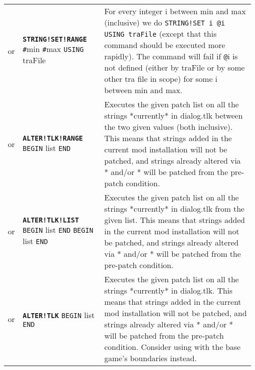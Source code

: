\documentclass{article}
\def\ttref#1{\ahrefloc{#1}{\tt #1}}
\def\DEFINE#1{{\tt \bf #1}\label{#1}\index{#1}}
\def\t#1{{\tt #1}}
\def\Slist{{\color{red} list }}
\begin{document}
\begin{tabular}{cp{10in}|p{10in}}
  or & \DEFINE{STRING!SET!RANGE} \t{\#}min \t{\#}max \t{USING} traFile &
    For every integer i between min and max (inclusive) we do
    \t{STRING!SET i @i USING traFile} (except that this command should be
    executed more rapidly). The command will fail if \t{@}i is not defined
    (either by traFile or by some other tra file in scope) for some i
    between min and max.  \\

	or & \DEFINE{ALTER!TLK!RANGE} \ttref{value} \ttref{value} \t{BEGIN} \ttref{patch} \Slist \t{END} &
		Executes the given patch list on all the strings *currently* in dialog.tlk between the
		two given values (both inclusive).
		This means that strings added in the current mod installation will not
		be patched, and strings already altered via \ttref{ALTER!TLK}* and/or \ttref{STRING!SET}*
		will be patched from the pre-patch condition.\\

or & \DEFINE{ALTER!TLK!LIST} \t{BEGIN} \ttref{value} \Slist \t{END} \t{BEGIN} \ttref{patch} \Slist \t{END} &
		Executes the given patch list on all the strings *currently* in dialog.tlk from the given list.
		This means that strings added in the current mod installation will not
		be patched, and strings already altered via \ttref{ALTER!TLK}* and/or \ttref{STRING!SET}*
		will be patched from the pre-patch condition. \\

	or & \DEFINE{ALTER!TLK} \t{BEGIN} \ttref{patch} \Slist \t{END} &
		Executes the given patch list on all the strings *currently* in dialog.tlk.
		This means that strings added in the current mod installation will not
		be patched, and strings already altered via \ttref{ALTER!TLK}* and/or \ttref{STRING!SET}*
		will be patched from the pre-patch condition. Consider using
		\ttref{ALTER!TLK!RANGE} with the base game's boundaries instead. \\


\end{tabular}
\end{document}

